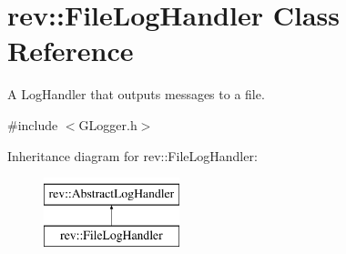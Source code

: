 \hypertarget{classrev_1_1_file_log_handler}{}\section{rev\+::File\+Log\+Handler Class Reference}
\label{classrev_1_1_file_log_handler}


A Log\+Handler that outputs messages to a file.  




{\ttfamily \#include $<$G\+Logger.\+h$>$}

Inheritance diagram for rev\+::File\+Log\+Handler\+:\begin{figure}[H]
\begin{center}
\leavevmode
\includegraphics[height=2.000000cm]{classrev_1_1_file_log_handler}
\end{center}
\end{figure}
